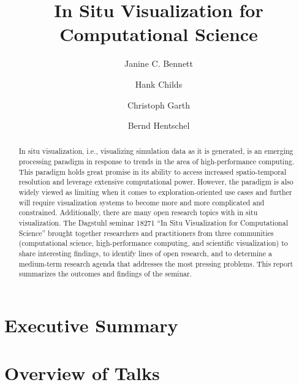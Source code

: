 \documentclass[a4paper,UKenglish]{dagrep}
\title{In Situ Visualization for Computational Science}
\author[1]{Janine C. Bennett}
\author[2]{Hank Childs}
\author[3]{Christoph Garth}
\author[4]{Bernd Hentschel}
\affil[1]{Sandia National Laboratories, Livermore}
\affil[2]{University of Oregon}
\affil[3]{Technische Universität Kaiserslautern}
\affil[4]{RWTH Aachen University}
\begin{document}
\maketitle

\begin{abstract}
In situ visualization, i.e., visualizing simulation data as it is generated, is an emerging processing paradigm in response to trends in the area of high-performance computing.  This paradigm holds great promise in its ability to access increased spatio-temporal resolution and leverage extensive computational power.  However, the paradigm is also widely viewed as limiting when it comes to exploration-oriented use cases and further will require visualization systems to become more and more complicated and constrained.  Additionally, there are many open research topics with in situ visualization. The Dagstuhl seminar 18271 ``In Situ Visualization for Computational Science'' brought together researchers and practitioners from three communities (computational science, high-performance computing, and scientific visualization) to share interesting findings, 
to identify lines of open research, and to determine a medium-term research agenda that addresses the most pressing problems. This report summarizes the outcomes and findings of the seminar.
\end{abstract}

\section{Executive Summary}

\license




\tableofcontents


\section{Overview of Talks}
\end{document}
